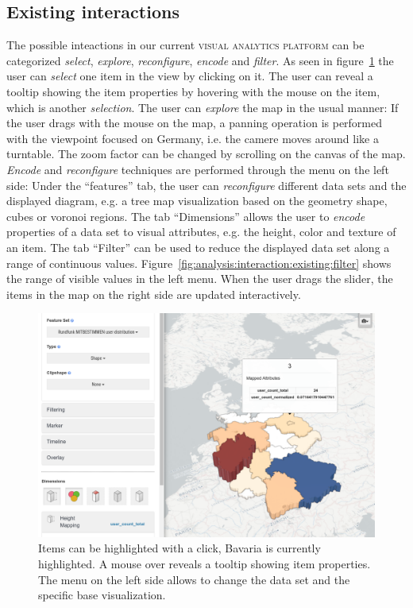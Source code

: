 \documentclass{article}
\newcommand{\visan}{\textsc{visual analytics platform}}
\begin{document}
\subsection{Existing interactions}
The possible inteactions in our current \visan{} can be categorized \emph{select}, \emph{explore}, \emph{reconfigure}, \emph{encode} and \emph{filter}.
As seen in figure~\ref{fig:analysis:interaction:existing} the user can \emph{select} one item in the view by clicking on it.
The user can reveal a tooltip showing the item properties by hovering with the mouse on the item, which is another \emph{selection}.
The user can \emph{explore} the map in the usual manner:
If the user drags with the mouse on the map, a panning operation is performed with the viewpoint focused on Germany, i.e. the camere moves around like a turntable.
The zoom factor can be changed by scrolling on the canvas of the map.
\emph{Encode} and \emph{reconfigure} techniques are performed through the menu on the left side:
Under the ``features'' tab, the user can \emph{reconfigure} different data sets and the displayed diagram, e.g. a tree map visualization based on the geometry shape, cubes or voronoi regions.
The tab ``Dimensions'' allows the user to \emph{encode} properties of a data set to visual attributes, e.g. the height, color and texture of an item.
The tab ``Filter'' can be used to reduce the displayed data set along a range of continuous values.
Figure~\ref{fig:analysis:interaction:existing:filter} shows the range of visible values in the left menu.
When the user drags the slider, the items in the map on the right side are updated interactively.

\begin{figure}[h!]
  \centering
  \includegraphics[width=\textwidth]{images/existing-interactions.png}
  \caption{
    Items can be highlighted with a click, Bavaria is currently highlighted.
    A mouse over reveals a tooltip showing item properties.
    The menu on the left side allows to change the data set and the specific base visualization.}
  \label{fig:analysis:interaction:existing}
\end{figure}
\end{document}
